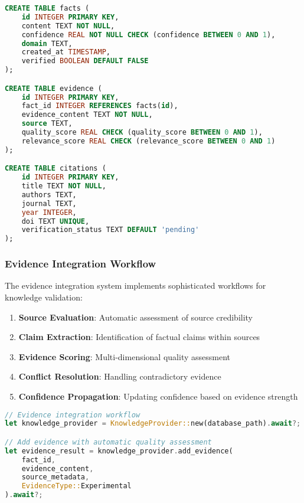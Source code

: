 \documentclass[12pt,a4paper,twoside]{article}
\begin{document}
\begin{itemize}
\begin{lstlisting}[language=sql,caption=Knowledge Database Schema]
CREATE TABLE facts (
    id INTEGER PRIMARY KEY,
    content TEXT NOT NULL,
    confidence REAL NOT NULL CHECK (confidence BETWEEN 0 AND 1),
    domain TEXT,
    created_at TIMESTAMP,
    verified BOOLEAN DEFAULT FALSE
);

CREATE TABLE evidence (
    id INTEGER PRIMARY KEY,
    fact_id INTEGER REFERENCES facts(id),
    evidence_content TEXT NOT NULL,
    source TEXT,
    quality_score REAL CHECK (quality_score BETWEEN 0 AND 1),
    relevance_score REAL CHECK (relevance_score BETWEEN 0 AND 1)
);

CREATE TABLE citations (
    id INTEGER PRIMARY KEY,
    title TEXT NOT NULL,
    authors TEXT,
    journal TEXT,
    year INTEGER,
    doi TEXT UNIQUE,
    verification_status TEXT DEFAULT 'pending'
);
\end{lstlisting}

\subsubsection{Evidence Integration Workflow}

The evidence integration system implements sophisticated workflows for knowledge validation:

\begin{enumerate}
\item \textbf{Source Evaluation}: Automatic assessment of source credibility
\item \textbf{Claim Extraction}: Identification of factual claims within sources
\item \textbf{Evidence Scoring}: Multi-dimensional quality assessment
\item \textbf{Conflict Resolution}: Handling contradictory evidence
\item \textbf{Confidence Propagation}: Updating confidence based on evidence strength
\end{enumerate}

\begin{lstlisting}[language=rust,caption=Evidence Integration Process]
// Evidence integration workflow
let knowledge_provider = KnowledgeProvider::new(database_path).await?;

// Add evidence with automatic quality assessment
let evidence_result = knowledge_provider.add_evidence(
    fact_id,
    evidence_content,
    source_metadata,
    EvidenceType::Experimental
).await?;


\end{lstlisting}
\end{itemize}
\end{document}
